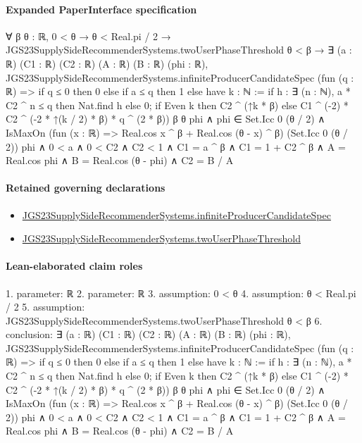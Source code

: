 \documentclass[10pt]{article}
\begin{document}
\paragraph{Expanded PaperInterface specification}
\begin{ReviewVerbatim}
∀ {β θ : ℝ},
  0 < θ →
    θ < Real.pi / 2 →
      JGS23SupplySideRecommenderSystems.twoUserPhaseThreshold θ < β →
        ∃ (a : ℝ) (C1 : ℝ) (C2 : ℝ) (A : ℝ) (B : ℝ) (phi : ℝ),
          JGS23SupplySideRecommenderSystems.infiniteProducerCandidateSpec
              (fun (q : ℝ) =>
                if q ≤ 0 then 0
                else
                  if a ≤ q then 1
                  else
                    have k : ℕ := if h : ∃ (n : ℕ), a * C2 ^ n ≤ q then Nat.find h else 0;
                    if Even k then C2 ^ (↑k * β) else C1 ^ (-2) * C2 ^ (-2 * ↑(k / 2) * β) * q ^ (2 * β))
              β θ phi ∧
            phi ∈ Set.Icc 0 (θ / 2) ∧
              IsMaxOn (fun (x : ℝ) => Real.cos x ^ β + Real.cos (θ - x) ^ β) (Set.Icc 0 (θ / 2)) phi ∧
                0 < a ∧
                  0 < C2 ∧
                    C2 < 1 ∧ C1 = a ^ β ∧ C1 = 1 + C2 ^ β ∧ A = Real.cos phi ∧ B = Real.cos (θ - phi) ∧ C2 = B / A
\end{ReviewVerbatim}

\paragraph{Retained governing declarations}
\begin{itemize}\raggedright
\item \hyperlink{governing-declaration-6be812a4b679146a}{JGS23\allowbreak{}Supply\allowbreak{}Side\allowbreak{}Recommender\allowbreak{}Systems.\allowbreak{}infinite\allowbreak{}Producer\allowbreak{}Candidate\allowbreak{}Spec}
\item \hyperlink{governing-declaration-63bdc0df0d11c740}{JGS23\allowbreak{}Supply\allowbreak{}Side\allowbreak{}Recommender\allowbreak{}Systems.\allowbreak{}two\allowbreak{}User\allowbreak{}Phase\allowbreak{}Threshold}
\end{itemize}
\paragraph{Lean-elaborated claim roles}\begin{ReviewVerbatim}
1. parameter: ℝ
2. parameter: ℝ
3. assumption: 0 < θ
4. assumption: θ < Real.pi / 2
5. assumption: JGS23SupplySideRecommenderSystems.twoUserPhaseThreshold θ < β
6. conclusion: ∃ (a : ℝ) (C1 : ℝ) (C2 : ℝ) (A : ℝ) (B : ℝ) (phi : ℝ),
  JGS23SupplySideRecommenderSystems.infiniteProducerCandidateSpec
      (fun (q : ℝ) =>
        if q ≤ 0 then 0
        else
          if a ≤ q then 1
          else
            have k : ℕ := if h : ∃ (n : ℕ), a * C2 ^ n ≤ q then Nat.find h else 0;
            if Even k then C2 ^ (↑k * β) else C1 ^ (-2) * C2 ^ (-2 * ↑(k / 2) * β) * q ^ (2 * β))
      β θ phi ∧
    phi ∈ Set.Icc 0 (θ / 2) ∧
      IsMaxOn (fun (x : ℝ) => Real.cos x ^ β + Real.cos (θ - x) ^ β) (Set.Icc 0 (θ / 2)) phi ∧
        0 < a ∧ 0 < C2 ∧ C2 < 1 ∧ C1 = a ^ β ∧ C1 = 1 + C2 ^ β ∧ A = Real.cos phi ∧ B = Real.cos (θ - phi) ∧ C2 = B / A
\end{ReviewVerbatim}
\end{document}
